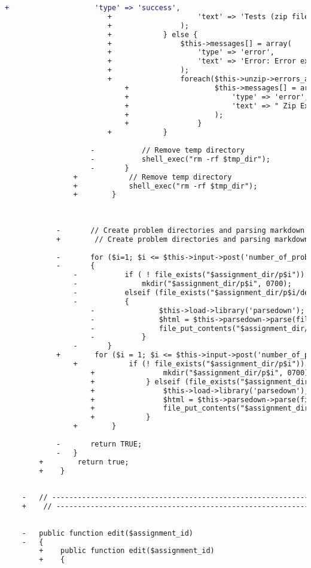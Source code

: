 \begin{lstlisting}[language=diff, caption=Perubahan pada kode Assignments.php]
						+                    'type' => 'success',
						+                    'text' => 'Tests (zip file) extracted successfully.'
						+                );
						+            } else {
						+                $this->messages[] = array(
						+                    'type' => 'error',
						+                    'text' => 'Error: Error extracting zip archive.'
						+                );
						+                foreach($this->unzip->errors_array() as $msg) {
							+                    $this->messages[] = array(
							+                        'type' => 'error',
							+                        'text' => " Zip Extraction Error: ".$msg
							+                    );
							+                }
						+            }
					
					-			// Remove temp directory
					-			shell_exec("rm -rf $tmp_dir");
					-		}
				+            // Remove temp directory
				+            shell_exec("rm -rf $tmp_dir");
				+        }
			
			
			
			-		// Create problem directories and parsing markdown files
			+        // Create problem directories and parsing markdown files
			
			-		for ($i=1; $i <= $this->input->post('number_of_problems'); $i++)
			-		{
				-			if ( ! file_exists("$assignment_dir/p$i"))
				-				mkdir("$assignment_dir/p$i", 0700);
				-			elseif (file_exists("$assignment_dir/p$i/desc.md"))
				-			{
					-				$this->load->library('parsedown');
					-				$html = $this->parsedown->parse(file_get_contents("$assignment_dir/p$i/desc.md"));
					-				file_put_contents("$assignment_dir/p$i/desc.html", $html);
					-			}
				-		}
			+        for ($i = 1; $i <= $this->input->post('number_of_problems'); $i++) {
				+            if (! file_exists("$assignment_dir/p$i")) {
					+                mkdir("$assignment_dir/p$i", 0700);
					+            } elseif (file_exists("$assignment_dir/p$i/desc.md")) {
					+                $this->load->library('parsedown');
					+                $html = $this->parsedown->parse(file_get_contents("$assignment_dir/p$i/desc.md"));
					+                file_put_contents("$assignment_dir/p$i/desc.html", $html);
					+            }
				+        }
			
			-		return TRUE;
			-	}
		+        return true;
		+    }
	
	
	-	// ------------------------------------------------------------------------
	+    // ------------------------------------------------------------------------
	
	
	-	public function edit($assignment_id)
	-	{
		+    public function edit($assignment_id)
		+    {
			

\end{lstlisting}
